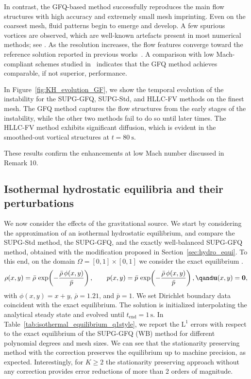 \documentclass[a4paper,10pt]{article}
\begin{document}
In contrast, the GFQ-based method successfully reproduces the main flow structures with high accuracy and extremely small mesh imprinting.
 Even on the coarsest mesh, fluid patterns begin to emerge and develop. A few spurious vortices are observed, which are well-known artefacts present in most numerical methods; see \cite{brown1995performance}. As the resolution increases, the flow features converge toward the reference solution reported in previous works~\cite{leidi2024performance,barsukow2025genuinely}. A comparison with low Mach-compliant schemes studied in~\cite{leidi2024performance} indicates that the GFQ method achieves comparable, if not superior, performance.

In Figure~\ref{fig:KH_evolution_GF}, we show the temporal evolution of the instability for the SUPG-GFQ, SUPG-Std, and HLLC-FV methods on the finest mesh. The GFQ method captures the flow structures from the early stages of the instability, while the other two methods fail to do so until later times. The HLLC-FV method exhibits significant diffusion, which is evident in the smoothed-out vortical structures at $t=80\ \text{s}$.

These results confirm  the enhancements at low Mach number  discussed in Remark 10.




\subsection{Isothermal hydrostatic equilibria and their perturbations} %

We now  consider the effects of the gravitational source.
We start by considering the approximation of an isothermal hydrostatic equilibrium,
and compare  the  SUPG-Std method, the SUPG-GFQ, and the exactly well-balanced SUPG-GFQ method,  obtained with the modification  proposed in Section~\ref{sec:hydro_equi}.
To this end,  on   the domain $\Omega = [0,1]\times[0,1]$ we consider the exact  equilibrium \cite{berberich2016general,xing2013high,chandrashekar2015second}. 
\begin{equation}
\rho(x,y)=\bar{\rho}\,\exp\!\left(-\frac{\bar{\rho}\,\phi(x,y)}{\bar{p}}\right),\qquad
p(x,y)=\bar{p}\,\exp\!\left(-\frac{\bar{\rho}\,\phi(x,y)}{\bar{p}}\right),\qand
\mathbf{u}(x,y)=\mathbf{0},
\end{equation}
with $\phi(x,y)=x+y$, $\bar{\rho}=1.21$, and $\bar{p}=1$. We set Dirichlet boundary data coincident with the exact equilibrium. 
The solution is initialized interpolating the analytical steady state and evolved until $t_{\mathrm{end}}=1\,\mathrm{s}$.  In Table~\ref{tab:isothermal_equilibrium_q1style}, we report the $\mathrm{L}^1$ errors with 
respect to the exact equilibrium of the SUPG-GFQ (WB) method for different polynomial degrees and mesh sizes.
We can see that the stationarity preserving method with the correction   preserves the equilibrium up to machine precision, as expected.
Interestingly, for $K\ge 2$  the stationarity preserving approach without any correction provides  error reductions  of more than 2 orders of magnitude.  
\end{document}

